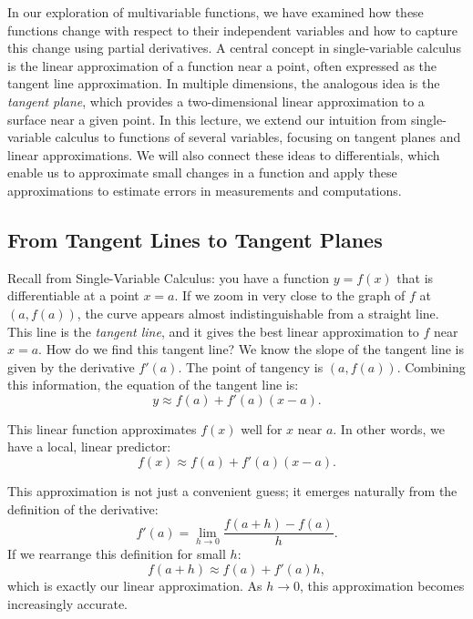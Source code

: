 \newpage


\noindent In our exploration of multivariable functions, we have examined how these functions change with respect to their independent variables and how to capture this change using partial derivatives. A central concept in single-variable calculus is the linear approximation of a function near a point, often expressed as the tangent line approximation. In multiple dimensions, the analogous idea is the \textit{tangent plane}, which provides a two-dimensional linear approximation to a surface near a given point. In this lecture, we extend our intuition from single-variable calculus to functions of several variables, focusing on tangent planes and linear approximations. We will also connect these ideas to differentials, which enable us to approximate small changes in a function and apply these approximations to estimate errors in measurements and computations.

\subsection*{From Tangent Lines to Tangent Planes} 

\noindent Recall from Single-Variable Calculus: you have a function \( y = f(x) \) that is differentiable at a point \( x = a \). If we zoom in very close to the graph of \( f \) at \( (a, f(a)) \), the curve appears almost indistinguishable from a straight line. This line is the \textit{tangent line}, and it gives the best linear approximation to \( f \) near \( x = a \). How do we find this tangent line? We know the slope of the tangent line is given by the derivative \( f'(a) \). The point of tangency is \((a, f(a))\). Combining this information, the equation of the tangent line is:
\[
y \approx f(a) + f'(a)(x - a).
\]

\noindent This linear function approximates \( f(x) \) well for \( x \) near \( a \). In other words, we have a local, linear predictor:
\[
f(x) \approx f(a) + f'(a)(x - a).
\]

\noindent This approximation is not just a convenient guess; it emerges naturally from the definition of the derivative:
\[
f'(a) = \lim_{h \to 0} \frac{f(a+h) - f(a)}{h}.
\]
If we rearrange this definition for small \( h \):
\[
f(a+h) \approx f(a) + f'(a)h,
\]
which is exactly our linear approximation. As \( h \to 0 \), this approximation becomes increasingly accurate. \\

